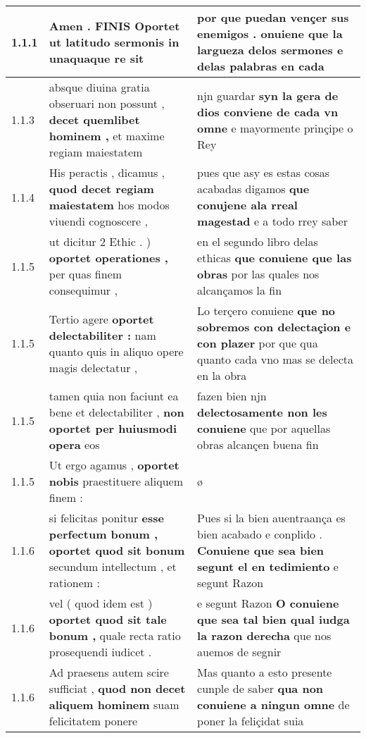 \begin{tabular}{|p{1cm}|p{6.5cm}|p{6.5cm}|}

\hline
1.1.1 & Amen . FINIS \textbf{ Oportet ut latitudo sermonis } in unaquaque re sit & por que puedan vençer sus enemigos . \textbf{ onuiene que la largueza delos sermones } e delas palabras en cada \\\hline
1.1.3 & absque diuina gratia obseruari non possunt , \textbf{ decet quemlibet hominem , } et maxime regiam maiestatem & njn guardar \textbf{ syn la gera de dios conviene de cada vn omne } e mayormente prinçipe o Rey \\\hline
1.1.4 & His peractis , dicamus , \textbf{ quod decet regiam maiestatem } hos modos viuendi cognoscere , & pues que asy es estas cosas acabadas digamos \textbf{ que conujene ala rreal magestad } e a todo rrey saber \\\hline
1.1.5 & ut dicitur 2 Ethic . ) \textbf{ oportet operationes , } per quas finem consequimur , & en el segundo libro delas ethicas \textbf{ que conuiene que las obras } por las quales nos alcançamos la fin \\\hline
1.1.5 & Tertio agere \textbf{ oportet delectabiliter : } nam quanto quis in aliquo opere magis delectatur , & Lo terçero conuiene \textbf{ que no sobremos con delectaçion e con plazer } por que qua quanto cada vno mas se delecta en la obra \\\hline
1.1.5 & tamen quia non faciunt ea bene et delectabiliter , \textbf{ non oportet per huiusmodi opera } eos & fazen bien njn \textbf{ delectosamente non les conuiene } que por aquellas obras alcançen buena fin \\\hline
1.1.5 & Ut ergo agamus , \textbf{ oportet nobis } praestituere aliquem finem : & ø \\\hline
1.1.6 & si felicitas ponitur \textbf{ esse perfectum bonum , oportet quod sit bonum } secundum intellectum , et rationem : & Pues si la bien auentraança es bien acabado e conplido . \textbf{ Conuiene que sea bien segunt el en tedimiento } e segunt Razon \\\hline
1.1.6 & vel ( quod idem est ) \textbf{ oportet quod sit tale bonum , } quale recta ratio prosequendi iudicet . & e segunt Razon \textbf{ O conuiene que sea tal bien qual iudga la razon derecha } que nos auemos de segnir \\\hline
1.1.6 & Ad praesens autem scire sufficiat , \textbf{ quod non decet aliquem hominem } suam felicitatem ponere & Mas quanto a esto presente cunple de saber \textbf{ qua non conuiene a ningun omne } de poner la feliçidat suia \\\hline

\end{tabular}
